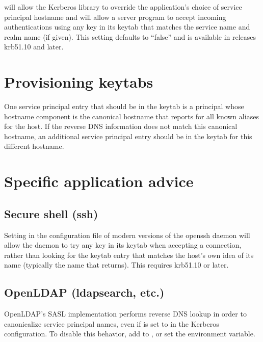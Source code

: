\documentclass[letterpaper,10pt,english]{sphinxmanual}
\begin{document}
\sphinxAtStartPar
will allow the Kerberos library to override the application’s choice
of service principal hostname and will allow a server program to
accept incoming authentications using any key in its keytab that
matches the service name and realm name (if given).  This setting
defaults to “false” and is available in releases krb5\sphinxhyphen{}1.10 and later.


\section{Provisioning keytabs}
\label{\detokenize{admin/princ_dns:provisioning-keytabs}}
\sphinxAtStartPar
One service principal entry that should be in the keytab is a
principal whose hostname component is the canonical hostname that
 reports for all known aliases for the host.  If the
reverse DNS information does not match this canonical hostname, an
additional service principal entry should be in the keytab for this
different hostname.


\section{Specific application advice}
\label{\detokenize{admin/princ_dns:specific-application-advice}}

\subsection{Secure shell (ssh)}
\label{\detokenize{admin/princ_dns:secure-shell-ssh}}
\sphinxAtStartPar
Setting  in the configuration file
of modern versions of the openssh daemon will allow the daemon to try
any key in its keytab when accepting a connection, rather than looking
for the keytab entry that matches the host’s own idea of its name
(typically the name that  returns).  This requires
krb5\sphinxhyphen{}1.10 or later.


\subsection{OpenLDAP (ldapsearch, etc.)}
\label{\detokenize{admin/princ_dns:openldap-ldapsearch-etc}}
\sphinxAtStartPar
OpenLDAP’s SASL implementation performs reverse DNS lookup in order to
canonicalize service principal names, even if  is set to
 in the Kerberos configuration.  To disable this behavior,
add  to , or set the
 environment variable.
\end{document}
